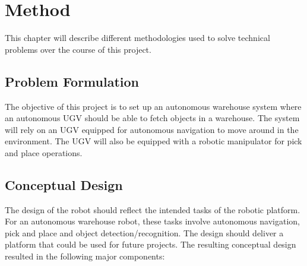 \chapter{Method}




This chapter will describe different methodologies used to solve technical problems over the course of this project.

\section{Problem Formulation}

The objective of this project is to set up an autonomous warehouse system where an autonomous UGV should be able to fetch objects in a warehouse. The system will rely on an UGV equipped for autonomous navigation to move around in the environment. The UGV will also be equipped with a robotic manipulator for pick and place operations.

\section{Conceptual Design}
The design of the robot should reflect the intended tasks of the robotic platform. For an autonomous warehouse robot, these tasks involve autonomous navigation, pick and place and object detection/recognition. The design should deliver a platform that could be used for future projects. The resulting conceptual design resulted in the following major components:

